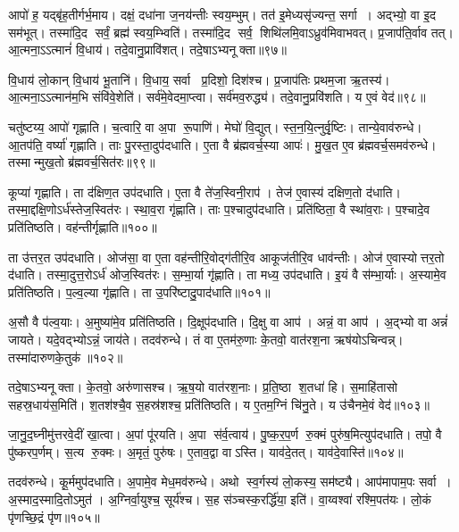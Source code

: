 आपो॑ ह॒ यद्बृ॑ह॒तीर्गर्भ॒माय\snn{}। दक्षं॒ दधा॑ना ज॒नय॑न्तीः स्वय॒म्भुम्‌। 
तत॑ इ॒मेध्यसृ॑ज्यन्त॒ सर्गा। अद्भ्यो॒ वा इ॒द सम॑भूत्‌। 
तस्मा॑दि॒द सर्वं॒ ब्रह्म॑ स्वय॒म्भ्विति॑। 
तस्मा॑दि॒द सर्व॒ शिथि॑लमि॒वाऽध्रुव॑मिवाभवत्‌। 
प्र॒जाप॑ति॒र्वाव तत्‌। आ॒त्मना॒ऽऽत्मानं॑ वि॒धाय॑। 
तदे॒वानु॒प्रावि॑शत्‌। तदे॒षाऽभ्यनूक्ता॥९७॥


वि॒धाय॑ लो॒कान्‌ वि॒धाय॑ भू॒तानि॑। वि॒धाय॒ सर्वा प्र॒दिशो॒ दिश॑श्च। 
प्र॒जाप॑तिः प्रथम॒जा ऋ॒तस्य॑। आ॒त्मना॒ऽऽत्मान॑म॒भि संवि॑वे॒शेति॑। 
सर्व॑मे॒वेदमा॒प्त्वा। सर्व॑मव॒रुद्ध्य॑। 
तदे॒वानु॒प्रवि॑शति। य ए॒वं वेद॑॥९८॥\anuvakamend


चतु॑ष्टय्य॒ आपो॑ गृह्णाति। च॒त्वारि॒ वा अ॒पा रू॒पाणि॑। 
मेघो॑ वि॒द्युत्‌। स्त॒न॒यि॒त्नुर्वृ॒ष्टिः। तान्ये॒वाव॑रुन्धे। 
आ॒तप॑ति॒ वर्ष्या॑ गृह्णाति। ताः पु॒रस्ता॒दुप॑दधाति। 
ए॒ता वै ब्र॑ह्मवर्च॒स्या आपः॑। मु॒ख॒त ए॒व ब्र॑ह्मवर्च॒समव॑रुन्धे। 
तस्मान्मुख॒तो ब्र॑ह्मवर्च॒सित॑रः॥९९॥


कूप्या॑ गृह्णाति। ता द॑क्षिण॒त उप॑दधाति। 
ए॒ता वै ते॑ज॒स्विनी॒राप॑। तेज॑ ए॒वास्य॑ दक्षिण॒तो द॑धाति। 
तस्मा॒द्दक्षि॒णोऽर्ध॑स्तेज॒स्वित॑रः। स्था॒व॒रा गृ॑ह्णाति। 
ताः प॒श्चादुप॑दधाति। प्रति॑ष्ठिता॒ वै स्था॑व॒राः। 
प॒श्चादे॒व प्रति॑तिष्ठति। वह॑न्तीर्गृह्णाति॥१००॥


ता उ॑त्तर॒त उप॑दधाति। ओज॑सा॒ वा ए॒ता वह॑न्तीरि॒वोद्ग॑तीरि॒व आकूज॑तीरि॒व धाव॑न्तीः। 
ओज॑ ए॒वास्योत्तर॒तो द॑धाति। तस्मा॒दुत्त॒रोऽर्ध॑ ओज॒स्वित॑रः। 
स॒म्भा॒र्या गृ॑ह्णाति। ता मध्य॒ उप॑दधाति। 
इ॒यं वै स॑म्भा॒र्याः। अ॒स्यामे॒व प्रति॑तिष्ठति। 
प॒ल्व॒ल्या गृ॑ह्णाति। ता उ॒परि॑ष्टादु॒पाद॑धाति॥१०१॥


अ॒सौ वै प॑ल्व॒याः। अ॒मुष्या॑मे॒व प्रति॑तिष्ठति। 
दि॒क्षूप॑दधाति। दि॒क्षु वा आप॑। 
अन्नं॒ वा आप॑। अ॒द्भ्यो वा अन्नं॑ जायते। 
यदे॒वद्भ्योऽन्नं॒ जाय॑ते। तदव॑रुन्धे। 
तं वा ए॒तम॑रु॒णाः के॒तवो॒ वात॑रश॒ना ऋष॑योऽचिन्वन्न्‌। 
तस्मा॑दारुणके॒तुक॑॥१०२॥


तदे॒षाऽभ्यनूक्ता। के॒तवो॒ अरु॑णासश्च। 
ऋ॒ष॒यो वात॑रश॒नाः। प्र॒ति॒ष्ठा श॒तधा॑ हि। 
स॒माहि॑तासो सहस्र॒धाय॑स॒मिति॑। श॒तश॑श्चै॒व स॒हस्र॑शश्च॒ प्रति॑तिष्ठति। 
य ए॒तम॒ग्निं चि॑नु॒ते। य उ॑चैनमे॒वं वेद॑॥१०३॥\anuvakamend


जा॒नु॒द॒घ्नीमु॑त्तरवे॒दीं खा॒त्वा। अ॒पां पू॑रयति। 
अ॒पा स॑र्व॒त्वाय॑। पु॒ष्क॒र॒प॒र्ण रु॒क्मं पुरु॑ष॒मित्युप॑दधाति। 
तपो॒ वै पु॑ष्करप॒र्णम्‌। स॒त्य रु॒क्मः। 
अ॒मृतं॒ पुरु॑षः। ए॒ताव॒द्वा वाऽस्ति। 
याव॑दे॒तत्। याव॑दे॒वास्ति॑॥१०४॥


तदव॑रुन्धे। कू॒र्ममुप॑दधाति। 
अ॒पामे॒व मेध॒मव॑रुन्धे। अथो स्व॒र्गस्य॑ लो॒कस्य॒ सम॑ष्ट्यै। 
आप॑मापाम॒पः सर्वा। अ॒स्माद॒स्मादि॒तोऽमुत॑। 
अ॒ग्निर्वा॒युश्च॒ सूर्य॑श्च। स॒ह स॑ञ्चस्क॒रर्द्धि॑या॒ इति॑। 
वा॒य्वश्वा॑ रश्मि॒पत॑यः। लो॒कं पृ॑णच्छि॒द्रं पृ॑ण॥१०५॥


